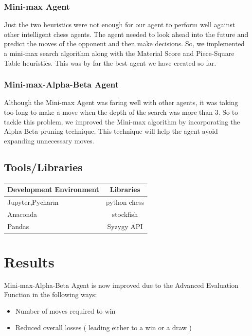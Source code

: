 \documentclass[12pt]{article}
\begin{document}
\subsubsection{Mini-max Agent}
Just the two heuristics were not enough for our agent to perform well against other intelligent chess agents. The agent needed to look ahead into the future and predict the moves of the opponent and then make decisions. So, we implemented a mini-max search algorithm along with the Material Score and Piece-Square Table heuristics. This was by far the best agent we have created so far. 

\subsubsection{Mini-max-Alpha-Beta Agent}
Although the Mini-max Agent was faring well with other agents, it was taking too long to make a move when the depth of the search was more than 3. So to tackle this problem, we improved the Mini-max algorithm by incorporating the Alpha-Beta pruning technique. This technique will help the agent avoid expanding unnecessary moves. 



\subsection{Tools/Libraries}
\begin{table}[h!]
  \begin{center}
    \label{tab:table1}
    \begin{tabular}{l|c} 
      \textbf{Development Environment} & \textbf{Libraries} \\
      \hline
      Jupyter,Pycharm & python-chess\\
      Anaconda & stockfish\\
      Pandas & Syzygy API\\
    \end{tabular}
  \end{center}
\end{table}
\section{Results}
Mini-max-Alpha-Beta Agent is now improved due to the Advanced Evaluation Function in the following ways:
\begin{itemize}
\item Number of moves required to win
\item Reduced overall losses ( leading either to a win or a draw )
\end{itemize}
\end{document}
